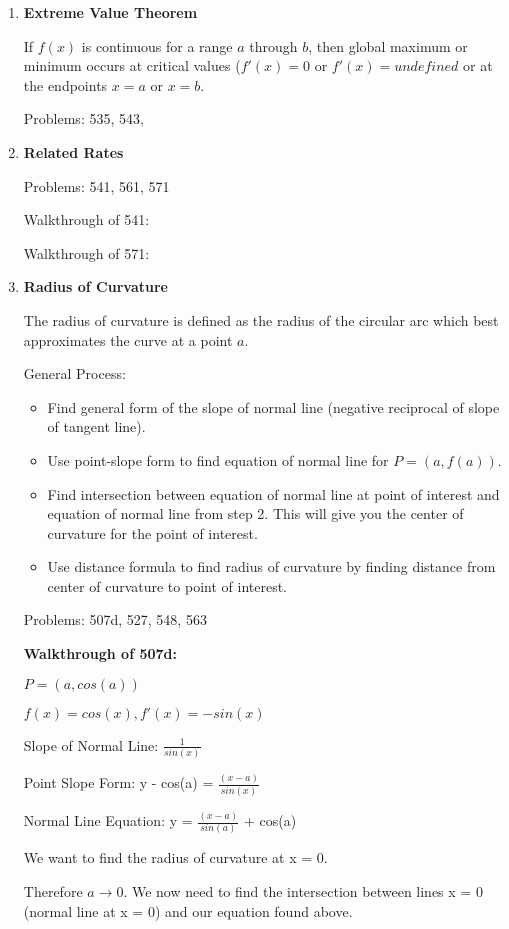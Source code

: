 \documentclass[11pt,twoside]{article}
\begin{document}
\begin{enumerate}
\item \textbf{Extreme Value Theorem}

If $f(x)$ is continuous for a range $a$ through $b$, then global maximum or minimum occurs at critical values ($f'(x) = 0$ or $f'(x) = undefined$ or at the endpoints $x = a$ or $x = b$.

Problems: 535, 543, 

\item \textbf{Related Rates}

Problems: 541, 561, 571

Walkthrough of 541: 

Walkthrough of 571: 

\item \textbf{Radius of Curvature} 

The radius of curvature is defined as the radius of the circular arc which best approximates the curve at a point $a$. 

General Process:
\begin{itemize}
    \item Find general form of the slope of normal line (negative reciprocal of slope of tangent line). 
    \item Use point-slope form to find equation of normal line for $P = (a, f(a))$. 
    \item Find intersection between equation of normal line at point of interest and equation of normal line from step 2. This will give you the center of curvature for the point of interest.
    \item Use distance formula to find radius of curvature by finding distance from center of curvature to point of interest. 
\end{itemize}

Problems: 507d, 527, 548, 563

\textbf{Walkthrough of 507d:}

$P = (a, cos(a))$

$f(x) = cos(x), f'(x) = -sin(x)$

Slope of Normal Line: \(\frac{1}{sin(x)}\)

Point Slope Form: y - cos(a) = \(\frac{(x-a)}{sin(x)}\)

Normal Line Equation: y = \(\frac{(x-a)}{sin(a)}\) + cos(a)

We want to find the radius of curvature at x = 0.

Therefore $a \rightarrow\text{0}$. We now need to find the intersection between lines x = 0 (normal line at x = 0) and our equation found above.


\end{enumerate}
\end{document}
